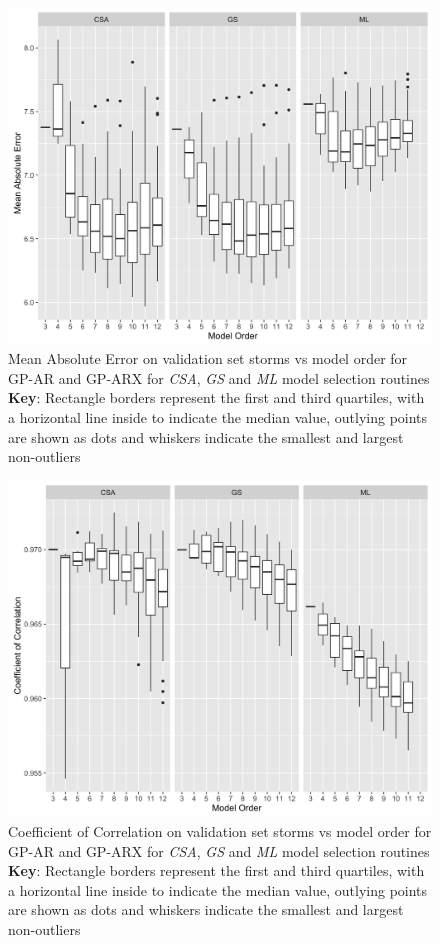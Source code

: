 \documentclass[sw, draft]{AGUTeX}
\begin{document}
\begin{figure}
\noindent\includegraphics[width=\textwidth]{Compare-mae-arx.png}
\caption{Mean Absolute Error on validation set storms vs model order for GP-AR and GP-ARX for \emph{CSA}, \emph{GS} and \emph{ML} model selection routines \\ \textbf{Key}: Rectangle borders represent the first and third quartiles, with a horizontal line inside to indicate the median value, outlying points are shown as dots and whiskers indicate the smallest and largest non-outliers}
\label{fig:CompareMaeARX}
\end{figure}

\begin{figure}
\noindent\includegraphics[width=\textwidth]{Compare-cc-arx.png}
\caption{Coefficient of Correlation on validation set storms vs model order for GP-AR and GP-ARX for \emph{CSA}, \emph{GS} and \emph{ML} model selection routines \\ \textbf{Key}: Rectangle borders represent the first and third quartiles, with a horizontal line inside to indicate the median value, outlying points are shown as dots and whiskers indicate the smallest and largest non-outliers}
\label{fig:CompareCCARX}
\end{figure}
\end{document}
